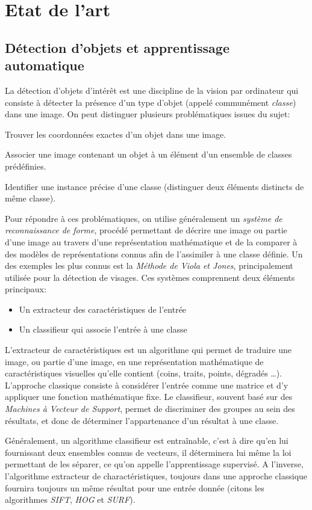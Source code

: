 	\section{Etat de l'art}

		\subsection{Détection d'objets et apprentissage automatique}
			
			La détection d'objets d'intérêt est une discipline de la vision par ordinateur qui consiste à détecter la présence d'un type d'objet (appelé communément \emph{classe}) dans une image. On peut distinguer plusieurs problématiques issues du sujet:
			\begin{description}[noitemsep]
				\item[Localisation:] Trouver les coordonnées exactes d'un objet dans une image.
				\item[Classification:] Associer une image contenant un objet à un élément d'un ensemble de classes prédéfinies.
				\item[Reconnaissance:] Identifier une instance précise d'une classe (distinguer deux éléments distincts de même classe).
			\end{description}
			Pour répondre à ces problématiques, on utilise généralement un \emph{système de reconnaissance de forme}, procédé permettant de décrire une image ou partie d'une image au travers d'une représentation mathématique et de la comparer à des modèles de représentations connus afin de l'assimiler à une classe définie. Un des exemples les plus connus est la \emph{Méthode de Viola et Jones}\cite{viola}, principalement utilisée pour la détection de visages. Ces systèmes comprennent deux éléments principaux:
			\begin{itemize}[noitemsep]
				\item Un extracteur des caractéristiques de l'entrée
				\item Un classifieur qui associe l'entrée à une classe
			\end{itemize}
			L'extracteur de caractéristiques est un algorithme qui permet de traduire une image, ou partie d'une image, en une représentation mathématique de caractéristiques visuelles qu'elle contient (coins, traits, points, dégradés \dots). L'approche classique consiste à considérer l'entrée comme une matrice et d'y appliquer une fonction mathématique fixe.
			Le classifieur, souvent basé sur des \emph{Machines à Vecteur de Support}\cite{svm}, permet de discriminer des groupes au sein des résultats, et donc de déterminer l'appartenance d'un résultat à une classe.
			\par
			Généralement, un algorithme classifieur est entraînable, c'est à dire qu'en lui fournissant deux ensembles connus de vecteurs, il déterminera lui même la loi permettant de les séparer, ce qu'on appelle l'apprentissage supervisé. A l'inverse, l'algorithme extracteur de charactéristiques, toujours dans une approche \og classique \fg{} fournira toujours un même résultat pour une entrée donnée (citons les algorithmes \emph{SIFT}\cite{sift}, \emph{HOG}\cite{hog} et \emph{SURF}\cite{surf}).
			
